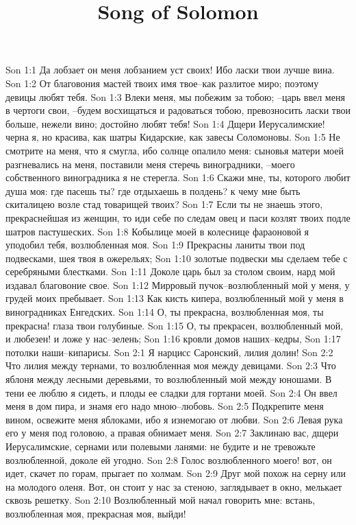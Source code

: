 

\title{Song of Solomon}

Son 1:1  Да лобзает он меня лобзанием уст своих! Ибо ласки твои лучше вина.
Son 1:2  От благовония мастей твоих имя твое--как разлитое миро; поэтому девицы любят тебя.
Son 1:3  Влеки меня, мы побежим за тобою; --царь ввел меня в чертоги свои, --будем восхищаться и радоваться тобою, превозносить ласки твои больше, нежели вино; достойно любят тебя!
Son 1:4  Дщери Иерусалимские! черна я, но красива, как шатры Кидарские, как завесы Соломоновы.
Son 1:5  Не смотрите на меня, что я смугла, ибо солнце опалило меня: сыновья матери моей разгневались на меня, поставили меня стеречь виноградники, --моего собственного виноградника я не стерегла.
Son 1:6  Скажи мне, ты, которого любит душа моя: где пасешь ты? где отдыхаешь в полдень? к чему мне быть скиталицею возле стад товарищей твоих?
Son 1:7  Если ты не знаешь этого, прекраснейшая из женщин, то иди себе по следам овец и паси козлят твоих подле шатров пастушеских.
Son 1:8  Кобылице моей в колеснице фараоновой я уподобил тебя, возлюбленная моя.
Son 1:9  Прекрасны ланиты твои под подвесками, шея твоя в ожерельях;
Son 1:10  золотые подвески мы сделаем тебе с серебряными блестками.
Son 1:11  Доколе царь был за столом своим, нард мой издавал благовоние свое.
Son 1:12  Мирровый пучок--возлюбленный мой у меня, у грудей моих пребывает.
Son 1:13  Как кисть кипера, возлюбленный мой у меня в виноградниках Енгедских.
Son 1:14  О, ты прекрасна, возлюбленная моя, ты прекрасна! глаза твои голубиные.
Son 1:15  О, ты прекрасен, возлюбленный мой, и любезен! и ложе у нас--зелень;
Son 1:16  кровли домов наших--кедры,
Son 1:17  потолки наши--кипарисы.
Son 2:1  Я нарцисс Саронский, лилия долин!
Son 2:2  Что лилия между тернами, то возлюбленная моя между девицами.
Son 2:3  Что яблоня между лесными деревьями, то возлюбленный мой между юношами. В тени ее люблю я сидеть, и плоды ее сладки для гортани моей.
Son 2:4  Он ввел меня в дом пира, и знамя его надо мною--любовь.
Son 2:5  Подкрепите меня вином, освежите меня яблоками, ибо я изнемогаю от любви.
Son 2:6  Левая рука его у меня под головою, а правая обнимает меня.
Son 2:7  Заклинаю вас, дщери Иерусалимские, сернами или полевыми ланями: не будите и не тревожьте возлюбленной, доколе ей угодно.
Son 2:8  Голос возлюбленного моего! вот, он идет, скачет по горам, прыгает по холмам.
Son 2:9  Друг мой похож на серну или на молодого оленя. Вот, он стоит у нас за стеною, заглядывает в окно, мелькает сквозь решетку.
Son 2:10  Возлюбленный мой начал говорить мне: встань, возлюбленная моя, прекрасная моя, выйди!
